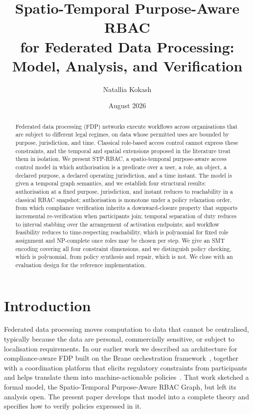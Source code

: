 \documentclass[11pt]{article}
\title{Spatio-Temporal Purpose-Aware RBAC\\ for Federated Data Processing:\\ Model, Analysis, and Verification}
\author{Natallia Kokash}
\date{August 2026}
\theoremstyle{definition}
\theoremstyle{plain}
\theoremstyle{remark}
\begin{document}
\maketitle

\begin{abstract}
Federated data processing (FDP) networks execute workflows across organisations
that are subject to different legal regimes, on data whose permitted uses are
bounded by purpose, jurisdiction, and time. Classical role-based access control
cannot express these constraints, and the temporal and spatial extensions
proposed in the literature treat them in isolation. We present STP-RBAC, a
spatio-temporal purpose-aware access control model in which authorisation is a
predicate over a user, a role, an object, a declared purpose, a declared
operating jurisdiction, and a time instant. The model is given a temporal graph
semantics, and we establish four structural results: authorisation at a fixed
purpose, jurisdiction, and instant reduces to reachability in a classical RBAC
snapshot; authorisation is monotone under a policy relaxation order, from which
compliance verification inherits a downward-closure property that supports
incremental re-verification when participants join; temporal separation of duty
reduces to interval stabbing over the arrangement of activation endpoints; and
workflow feasibility reduces to time-respecting reachability, which is
polynomial for fixed role assignment and NP-complete once roles may be chosen
per step. We give an SMT encoding covering all four constraint dimensions, and
we distinguish policy checking, which is polynomial, from policy synthesis and
repair, which is not. We close with an evaluation design for the reference
implementation.
\end{abstract}

\section{Introduction}
\label{sec:intro}

Federated data processing moves computation to data that cannot be centralised,
typically because the data are personal, commercially sensitive, or subject to
localisation requirements. In our earlier work we described an architecture for
compliance-aware FDP built on the Brane orchestration
framework~\citep{valkering2021brane}, together with a coordination platform
that elicits regulatory constraints from participants and helps translate them
into machine-actionable policies~\citep{kokash2026compliance}. That work
sketched a formal model, the Spatio-Temporal Purpose-Aware RBAC Graph, but left
its analysis open. The present paper develops that model into a complete theory
and specifies how to verify policies expressed in it.
\end{document}
